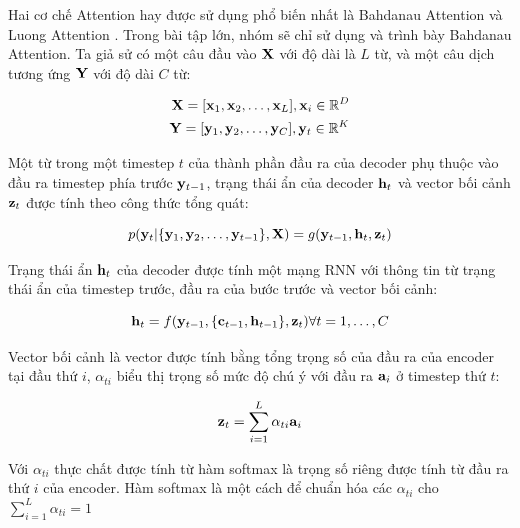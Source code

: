 \documentclass[14pt, a4paper]{article}
\numberwithin{equation}{section}
\numberwithin{algorithm}{section}
\numberwithin{figure}{section}
\numberwithin{table}{section}
\numberwithin{dl}{section}
\numberwithin{md}{section}
\numberwithin{bd}{section}
\numberwithin{dn}{section}
\numberwithin{hq}{section}
\begin{document}
    Hai cơ chế Attention hay được sử dụng phổ biến nhất là Bahdanau Attention \cite{bahdanau2014neural} và Luong Attention \cite{luong2014addressing}. Trong bài tập lớn, nhóm sẽ chỉ sử dụng và trình bày Bahdanau Attention.
    Ta giả sử có một câu đầu vào $\bold{X}$ với độ dài là $L$ từ, và một câu dịch tương ứng $\bold{Y}$ với độ dài $C$ từ:

    \begin{equation}
        \begin{aligned}
            \bold{X} = \lbrack \bold{x}_1, \bold{x}_2, \dots, \bold{x}_L \rbrack, \bold{x}_i \in \mathbb{R}^D \\
            \bold{Y} = \lbrack \bold{y}_1, \bold{y}_2, \dots, \bold{y}_C \rbrack, \bold{y}_t \in \mathbb{R}^K
        \end{aligned}
    \end{equation}

    Một từ trong một timestep $t$ của thành phần đầu ra của decoder phụ thuộc vào đầu ra timestep phía trước $\bold{y}_{t-1}$, trạng thái ẩn của decoder $\bold{h}_t$ và vector bối cảnh $\bold{z}_t$ được tính theo công thức tổng quát:

    \begin{equation}
        p(\bold{y}_t \vert \lbrace \bold{y}_1, \bold{y}_2, \dots, \bold{y}_{t-1} \rbrace, \bold{X}) = g(\bold{y}_{t-1}, \bold{h}_t, \bold{z}_t)
    \end{equation}

    Trạng thái ẩn $\bold{h}_t$ của decoder được tính một mạng RNN với thông tin từ trạng thái ẩn của timestep trước, đầu ra của bước trước và vector bối cảnh:
    
    \begin{equation}
        \bold{h}_t = f(\bold{y}_{t-1}, \lbrace \bold{c}_{t-1}, \bold{h}_{t-1} \rbrace, \bold{z}_t) \forall t=1,\dots,C
    \end{equation}

    Vector bối cảnh là vector được tính bằng tổng trọng số của đầu ra của encoder tại đầu thứ $i$, $\alpha_{ti}$ biểu thị trọng số mức độ chú ý với đầu ra $\bold{a}_i$ ở timestep thứ $t$:

    \begin{equation}
        \bold{z}_t = \sum_{i=1}^{L}\alpha_{ti}\bold{a}_i
    \end{equation}

    Với $\alpha_{ti}$ thực chất được tính từ hàm softmax là trọng số riêng được tính từ đầu ra thứ $i$ của encoder. Hàm softmax là một cách để chuẩn hóa các $\alpha_{ti}$ cho $\sum_{i=1}^{L}\alpha_{ti}=1$
\end{document}
